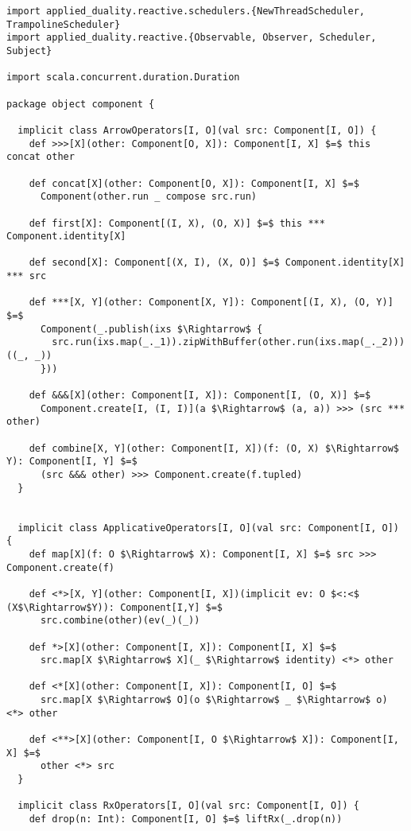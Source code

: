 \begin{lstlisting}[style=ScalaStyle, caption={Operators on \comp}, label={lst:component-operators}]
import applied_duality.reactive.schedulers.{NewThreadScheduler, TrampolineScheduler}
import applied_duality.reactive.{Observable, Observer, Scheduler, Subject}

import scala.concurrent.duration.Duration

package object component {

  implicit class ArrowOperators[I, O](val src: Component[I, O]) {
    def >>>[X](other: Component[O, X]): Component[I, X] $=$ this concat other

    def concat[X](other: Component[O, X]): Component[I, X] $=$
      Component(other.run _ compose src.run)

    def first[X]: Component[(I, X), (O, X)] $=$ this *** Component.identity[X]

    def second[X]: Component[(X, I), (X, O)] $=$ Component.identity[X] *** src

    def ***[X, Y](other: Component[X, Y]): Component[(I, X), (O, Y)] $=$
      Component(_.publish(ixs $\Rightarrow$ {
        src.run(ixs.map(_._1)).zipWithBuffer(other.run(ixs.map(_._2)))((_, _))
      }))

    def &&&[X](other: Component[I, X]): Component[I, (O, X)] $=$
      Component.create[I, (I, I)](a $\Rightarrow$ (a, a)) >>> (src *** other)

    def combine[X, Y](other: Component[I, X])(f: (O, X) $\Rightarrow$ Y): Component[I, Y] $=$
      (src &&& other) >>> Component.create(f.tupled)
  }
  

  implicit class ApplicativeOperators[I, O](val src: Component[I, O]) {
    def map[X](f: O $\Rightarrow$ X): Component[I, X] $=$ src >>> Component.create(f)

    def <*>[X, Y](other: Component[I, X])(implicit ev: O $<:<$ (X$\Rightarrow$Y)): Component[I,Y] $=$
      src.combine(other)(ev(_)(_))

    def *>[X](other: Component[I, X]): Component[I, X] $=$
      src.map[X $\Rightarrow$ X](_ $\Rightarrow$ identity) <*> other

    def <*[X](other: Component[I, X]): Component[I, O] $=$
      src.map[X $\Rightarrow$ O](o $\Rightarrow$ _ $\Rightarrow$ o) <*> other

    def <**>[X](other: Component[I, O $\Rightarrow$ X]): Component[I, X] $=$
      other <*> src
  }
  
  implicit class RxOperators[I, O](val src: Component[I, O]) {
    def drop(n: Int): Component[I, O] $=$ liftRx(_.drop(n))


\end{lstlisting}
